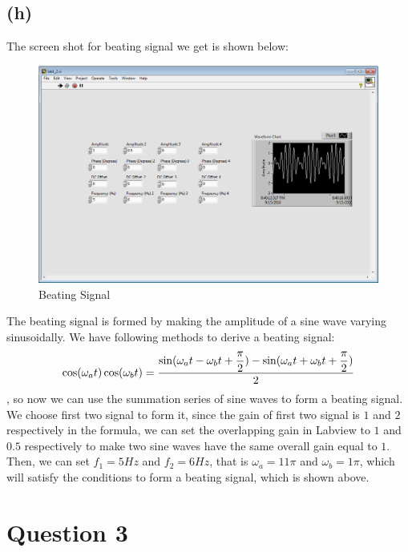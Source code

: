 \documentclass[letterpaper]{article}
\begin{document}
\subsection*{(h)}
The screen shot for beating signal we get is shown below:
\begin{figure}[H]
	\centering
	\includegraphics[scale=0.6]{beating.PNG}
	\caption{Beating Signal}
	\label{fig:beating}
\end{figure}
The beating signal is formed by making the amplitude of a sine wave varying sinusoidally. We have following methods to derive a beating signal:
$$\cos(\omega_at)\cos(\omega_bt) = \frac{\displaystyle \sin(\omega_at - \omega_bt + \frac{\displaystyle \pi}{\displaystyle 2}) - \sin(\omega_at + \omega_bt + \frac{\displaystyle \pi}{\displaystyle 2})}{\displaystyle 2}$$, so now we can use the summation series of sine waves to form a beating signal. We choose first two signal to form it, since the gain of first two signal is $1$ and $2$ respectively in the formula, we can set the overlapping gain in Labview to $1$ and $0.5$ respectively to make two sine waves have the same overall gain equal to $1$. Then, we can set $f_1 = 5 Hz$ and $f_2 = 6 Hz$, that is $\omega_a = 11\pi$ and $\omega_b = 1\pi$, which will satisfy the conditions to form a beating signal, which is shown above.

\hspace*{3 em}
\section*{Question 3}
\end{document}
